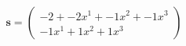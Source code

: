 \documentclass[preview]{standalone}
\begin{document}
\begin{align*}
\mathbf{s} = \begin{pmatrix}-2 + -2x^{1} + -1x^{2} + -1x^{3} \\ -1x^{1} + 1x^{2} + 1x^{3}\end{pmatrix}
\end{align*}
\end{document}
